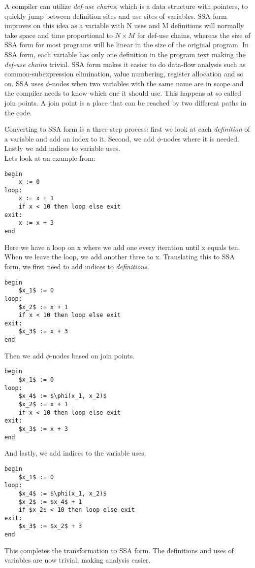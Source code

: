 A compiler can utilize \emph{def-use chains}, which is a data structure with pointers, to quickly jump between definition sites and use sites of variables.
SSA form improves on this idea as a variable with N uses and M definitions will normally take space and time proportional to $N \times M$ for def-use chains, whereas the size of SSA form for most programs will be linear in the size of the original program.
In SSA form, each variable has only one definition in the program text making the \emph{def-use chains} trivial.
SSA form makes it easier to do data-flow analysis such as common-subexpression elimination, value numbering, register allocation and so on. %
SSA uses $\phi$-nodes when two variables with the same name are in scope and the compiler needs to know which one it should use. This happens at so called join points. A join point is a place that can be reached by two different paths in the code.

Converting to SSA form is a three-step process: first we look at each \emph{definition} of a variable and add an index to it. Second, we add $\phi$-nodes where it is needed. Lastly we add indices to variable uses. \\
Lets look at an example from\cite{10.1007/978-3-319-41579-6_16}:
\begin{lstlisting}
begin
    x := 0
loop:
    x := x + 1
    if x < 10 then loop else exit
exit:
    x := x + 3
end
\end{lstlisting}
Here we have a loop on x where we add one every iteration until x equals ten. When we leave the loop, we add another three to x.
Translating this to SSA form, we first need to add indices to \emph{definitions}.
\begin{lstlisting}[mathescape=true]
begin
    $x_1$ := 0
loop:
    $x_2$ := x + 1
    if x < 10 then loop else exit
exit:
    $x_3$ := x + 3
end
\end{lstlisting}
Then we add $\phi$-nodes based on join points.
\begin{lstlisting}[mathescape=true]
begin
    $x_1$ := 0
loop:
    $x_4$ := $\phi(x_1, x_2)$
    $x_2$ := x + 1
    if x < 10 then loop else exit
exit:
    $x_3$ := x + 3
end
\end{lstlisting}
And lastly, we add indices to the variable uses.
\begin{lstlisting}[mathescape=true]
begin
    $x_1$ := 0
loop:
    $x_4$ := $\phi(x_1, x_2)$
    $x_2$ := $x_4$ + 1
    if $x_2$ < 10 then loop else exit
exit:
    $x_3$ := $x_2$ + 3
end
\end{lstlisting}
This completes the transformation to SSA form. The definitions and uses of variables are now trivial, making analysis easier.

